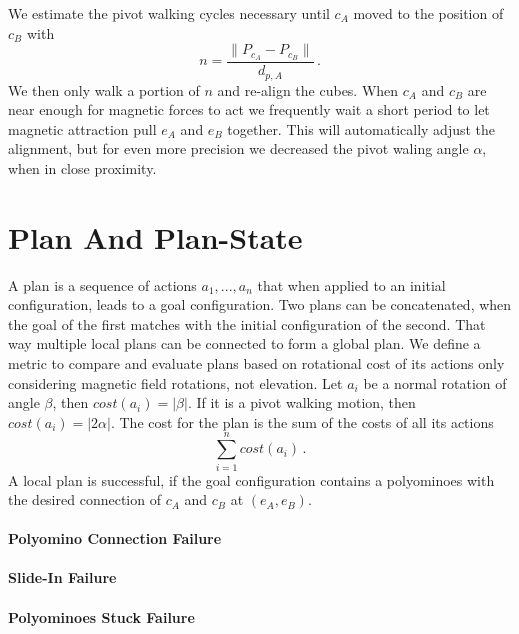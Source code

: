 We estimate the pivot walking cycles necessary until $c_A$ moved to the position of $c_B$ with
\begin{equation*}
n = \frac{\lVert P_{c_A} - P_{c_B}\rVert}{d_{p,A}} \,.
\end{equation*}
We then only walk a portion of $n$ and re-align the cubes.
When $c_A$ and $c_B$ are near enough for magnetic forces to act we frequently wait a short period to let magnetic attraction pull $e_A$ and $e_B$ together.
This will automatically adjust the alignment, but for even more precision we decreased the pivot waling angle $\alpha$, when in close proximity.

\section{Plan And Plan-State}
\label{sec:plan}

A plan is a sequence of actions $a_1, ... , a_n$ that when applied to an initial configuration, leads to a goal configuration.
Two plans can be concatenated, when the goal of the first matches with the initial configuration of the second.
That way multiple local plans can be connected to form a global plan.
We define a metric to compare and evaluate plans based on rotational cost of its actions only considering magnetic field rotations, not elevation.
Let $a_i$ be a normal rotation of angle $\beta$, then $cost(a_i) = |\beta|$.
If it is a pivot walking motion, then $cost(a_i) = |2\alpha|$.
The cost for the plan is the sum of the costs of all its actions
\begin{equation*}
\sum_{i=1}^{n} cost(a_i) \,.
\end{equation*}
A local plan is successful, if the goal configuration contains a polyominoes with the desired connection of $c_A$ and $c_B$ at $(e_A, e_B)$.

\paragraph{Polyomino Connection Failure}

\paragraph{Slide-In Failure}

\paragraph{Polyominoes Stuck Failure}

